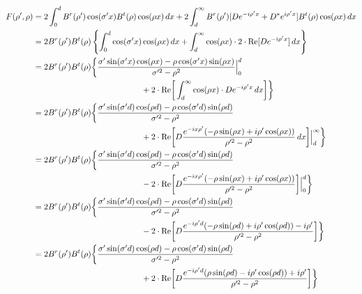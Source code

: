 \documentclass[11pt, oneside]{article}   	%
\begin{document}
\begin{align*}
F(\rho ',\rho) &= 2 \int_{0}^{d} B^{r}(\rho ')\cos(\sigma 'x) B^{t}(\rho)\cos(\rho x) \, dx + 2 \int_{d}^{\infty} B^{r}(\rho ')[De^{-i\rho 'x} + D^{*}e^{i\rho 'x}] B^{t}(\rho)\cos(\rho x) \, dx \\
&= 2B^{r}(\rho ') B^{t}(\rho) \left\{ \int_{0}^{d} \cos(\sigma 'x) \cos(\rho x) \, dx + \int_{d}^{\infty} \cos(\rho x) \cdot 2 \cdot \text{Re}[De^{-i\rho 'x}] \, dx \right\} \\
&= 2B^{r}(\rho ') B^{t}(\rho) \bigg\{ \frac{\sigma '\sin(\sigma 'x) \cos(\rho x) - \rho\cos(\sigma 'x) \sin(\rho x)}{\sigma '^{2}-\rho^{2}} \Big|_{0}^{d}  \\
	&\hspace{132px} {} + 2 \cdot \text{Re} \bigg[  \int_{d}^{\infty} \cos(\rho x) \cdot De^{-i\rho 'x} \, dx \bigg] \bigg\} \\
&= 2B^{r}(\rho ') B^{t}(\rho) \bigg\{ \frac{\sigma '\sin(\sigma 'd) \cos(\rho d) - \rho\cos(\sigma 'd) \sin(\rho d)}{\sigma '^{2}-\rho^{2}} \\
	&\hspace{132px} {} + 2 \cdot \text{Re} \bigg[  D\frac{e^{-ix\rho '}(-\rho\sin(\rho x) + i\rho '\cos(\rho x))}{\rho '^{2} - \rho^{2}}  \, dx \bigg] \Big|_{d}^{\infty} \bigg\} \\
&= 2B^{r}(\rho ') B^{t}(\rho) \bigg\{ \frac{\sigma '\sin(\sigma 'd) \cos(\rho d) - \rho\cos(\sigma 'd) \sin(\rho d)}{\sigma '^{2}-\rho^{2}} \\
	&\hspace{132px} {} - 2 \cdot \text{Re} \bigg[  D\frac{e^{-ix\rho '}(-\rho\sin(\rho x) + i\rho '\cos(\rho x))}{\rho '^{2} - \rho^{2}} \bigg] \Big|_{0}^{d}\bigg\} \\
&= 2B^{r}(\rho ') B^{t}(\rho) \bigg\{ \frac{\sigma '\sin(\sigma 'd) \cos(\rho d) - \rho\cos(\sigma 'd) \sin(\rho d)}{\sigma '^{2}-\rho^{2}} \\
	&\hspace{132px} {} - 2 \cdot \text{Re} \bigg[  D\frac{e^{-i\rho 'd}(-\rho\sin(\rho d) + i\rho '\cos(\rho d)) - i\rho '}{\rho '^{2} - \rho^{2}} \bigg] \bigg\} \\
&= 2B^{r}(\rho ') B^{t}(\rho) \bigg\{ \frac{\sigma '\sin(\sigma 'd) \cos(\rho d) - \rho\cos(\sigma 'd) \sin(\rho d)}{\sigma '^{2}-\rho^{2}} \\
	&\hspace{132px} {} + 2 \cdot \text{Re} \bigg[  D\frac{e^{-i\rho 'd}(\rho\sin(\rho d) - i\rho '\cos(\rho d)) + i\rho '}{\rho '^{2} - \rho^{2}} \bigg] \bigg\}
\end{align*}
\end{document}
